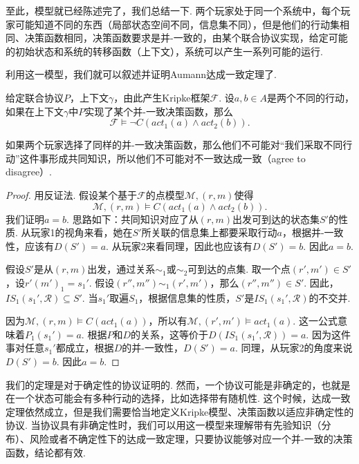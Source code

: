 至此，模型就已经陈述完了，我们总结一下. 两个玩家处于同一个系统中，每个玩家可能知道不同的东西（局部状态空间不同，信息集不同），但是他们的行动集相同、决策函数相同，决策函数要求是并-一致的，由某个联合协议实现，给定可能的初始状态和系统的转移函数（上下文），系统可以产生一系列可能的运行.

利用这一模型，我们就可以叙述并证明Aumann达成一致定理了. 

\begin{theorem}[Aumann达成一致定理]
给定联合协议$P$，上下文$\gamma$，由此产生Kripke框架$\mathcal F$. 设$a,b\in A$是两个不同的行动，如果在上下文$\gamma$中$P$实现了某个并-一致决策函数，那么
\[\mathcal F\vDash\neg C(act_1(a)\wedge act_2(b)).\]
\end{theorem}

如果两个玩家选择了同样的并-一致决策函数，那么他们不可能对“我们采取不同行动”这件事形成共同知识，所以他们不可能对不一致达成一致（agree to disagree）.

\begin{proof}
用反证法. 假设某个基于$\mathcal F$的点模型$\mathcal M,(r,m)$使得
    \[\mathcal M,(r,m)\vDash C(act_1(a)\wedge act_2(b)).\]
我们证明$a=b$. 思路如下：共同知识对应了从$(r,m)$出发可到达的状态集$S'$的性质. 从玩家1的视角来看，她在$S'$所关联的信息集上都要采取行动$a$，根据并-一致性，应该有$D(S')=a$. 从玩家2来看同理，因此也应该有$D(S')=b$. 因此$a=b$.

假设$S'$是从$(r,m)$出发，通过关系$\sim_1$或$\sim_2$可到达的点集. 取一个点$(r',m')\in S'$，设$r'(m')_1=s_1'$. 假设$(r'',m'')\sim_1(r',m')$，那么$(r'',m'')\in S'$. 因此，$IS_1(s_1',\mathcal R)\subseteq S'$. 当$s_1'$取遍$S_1$，根据信息集的性质，$S'$是$IS_1(s_1',\mathcal R)$的不交并.

因为$\mathcal M,(r,m)\vDash C(act_1(a))$，所以有$\mathcal M,(r',m')\vDash act_1(a)$. 这一公式意味着$P_1(s_1')=a$. 根据$P$和$D$的关系，这等价于$D(IS_1(s_1',\mathcal R))=a$. 因为这件事对任意$s_1'$都成立，根据$D$的并-一致性，$D(S')=a$. 同理，从玩家2的角度来说$D(S')=b$. 因此$a=b$.
\end{proof}

\begin{remark}
我们的定理是对于确定性的协议证明的. 然而，一个协议可能是非确定的，也就是在一个状态可能会有多种行动的选择，比如选择带有随机性. 这个时候，达成一致定理依然成立，但是我们需要恰当地定义Kripke模型、决策函数以适应非确定性的协议. 当协议具有非确定性时，我们可以用这一模型来理解带有先验知识（分布）、风险或者不确定性下的达成一致定理，只要协议能够对应一个并-一致的决策函数，结论都有效.
\end{remark}


